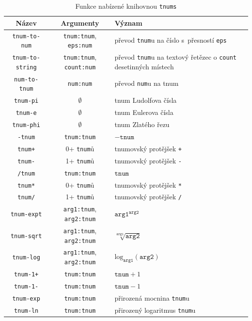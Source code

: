 \begin{table}[H]
\begin{mdframed}[backgroundcolor=lightpink,innertopmargin=-2.5pt,innerbottommargin=2.5pt]
\centering
\caption{Funkce nabízené knihovnou \texttt{tnums}}
\label{tab:funkce_rozhrani}
\begin{tabular}{| >{\columncolor[gray]{1}} c |>{\columncolor[gray]{1}}c|>{\columncolor[gray]{1}}p{4.8cm}|}
\hline
Název & Argumenty & Význam\\ \hline \hline
\texttt{tnum-to-num} & \texttt{tnum:tnum}, \texttt{eps:num} & převod \texttt{tnum}u na číslo s~přesností \texttt{eps}\\
\texttt{tnum-to-string} & \texttt{tnum:tnum}, \texttt{count:num} & převod \texttt{tnum}u na textový řetězec o \texttt{count} desetinných místech\\\hline
\texttt{num-to-tnum}&\texttt{num:num}&převod \texttt{num}u na tnum\\
\texttt{tnum-pi}&$\emptyset$&tnum Ludolfova čísla\\
\texttt{tnum-e}&$\emptyset$&tnum Eulerova čísla\\
\texttt{tnum-phi}&$\emptyset$&tnum Zlatého řezu\\\hline
\texttt{-tnum}&\texttt{tnum:tnum}&$-\texttt{tnum}$\\
\texttt{tnum+}&0+ \texttt{tnum}ů&tnumovský protějšek \texttt{+}\\
\texttt{tnum-}&1+ \texttt{tnum}ů&tnumovský protějšek \texttt{-}\\
\texttt{/tnum}&\texttt{tnum:tnum}&$\texttt{tnum}$\\
\texttt{tnum*}&0+ \texttt{tnum}ů&tnumovský protějšek \texttt{*}\\
\texttt{tnum/}&1+ \texttt{tnum}ů&tnumovský protějšek \texttt{/}\\
\texttt{tnum-expt}&\texttt{arg1:tnum}, \texttt{arg2:tnum}&$\texttt{arg1}^{\texttt{arg2}}$\\
\texttt{tnum-sqrt}&\texttt{arg1:tnum}, \texttt{arg2:tnum}&$\sqrt[\texttt{arg1}]{\texttt{arg2}}$\\
\texttt{tnum-log}&\texttt{arg1:tnum}, \texttt{arg2:tnum}&$\mathrm{log}_{\texttt{arg1}}(\texttt{arg2})$\\
\texttt{tnum-1+}&\texttt{tnum:tnum}&$\texttt{tnum} + 1$\\
\texttt{tnum-1-}&\texttt{tnum:tnum}&$\texttt{tnum} - 1$\\\hline
\texttt{tnum-exp}&\texttt{tnum:tnum}&přirozená mocnina \texttt{tnum}u\\
\texttt{tnum-ln}&\texttt{tnum:tnum}&přirozený logaritmus \texttt{tnum}u\\

\end{tabular}
\end{mdframed}
\end{table}
